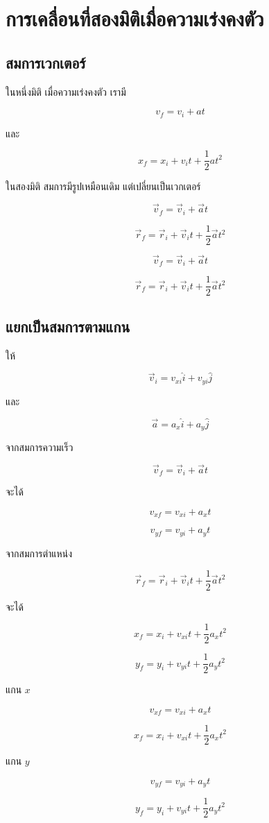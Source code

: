 \section{การเคลื่อนที่สองมิติเมื่อความเร่งคงตัว}

\subsection{สมการเวกเตอร์}

ในหนึ่งมิติ เมื่อความเร่งคงตัว เรามี

\[
v_f=v_i+at
\]

และ

\[
x_f=x_i+v_it+\frac{1}{2}at^2
\]

ในสองมิติ สมการมีรูปเหมือนเดิม แต่เปลี่ยนเป็นเวกเตอร์

\[
\vec{v}_f=\vec{v}_i+\vec{a}t
\]

\[
\vec{r}_f=\vec{r}_i+\vec{v}_it+\frac{1}{2}\vec{a}t^2
\]

\begin{tcolorbox}[title=สมการเวกเตอร์เมื่อความเร่งคงตัว]
\[
\vec{v}_f=\vec{v}_i+\vec{a}t
\]

\[
\vec{r}_f=\vec{r}_i+\vec{v}_it+\frac{1}{2}\vec{a}t^2
\]
\end{tcolorbox}

\subsection{แยกเป็นสมการตามแกน}

ให้

\[
\vec{v}_i=v_{xi}\hat{i}+v_{yi}\hat{j}
\]

และ

\[
\vec{a}=a_x\hat{i}+a_y\hat{j}
\]

จากสมการความเร็ว

\[
\vec{v}_f=\vec{v}_i+\vec{a}t
\]

จะได้

\[
v_{xf}=v_{xi}+a_xt
\]

\[
v_{yf}=v_{yi}+a_yt
\]

จากสมการตำแหน่ง

\[
\vec{r}_f=\vec{r}_i+\vec{v}_it+\frac{1}{2}\vec{a}t^2
\]

จะได้

\[
x_f=x_i+v_{xi}t+\frac{1}{2}a_xt^2
\]

\[
y_f=y_i+v_{yi}t+\frac{1}{2}a_yt^2
\]

\begin{tcolorbox}[title=สมการตามแกนเมื่อความเร่งคงตัว]
แกน $x$

\[
v_{xf}=v_{xi}+a_xt
\]

\[
x_f=x_i+v_{xi}t+\frac{1}{2}a_xt^2
\]

แกน $y$

\[
v_{yf}=v_{yi}+a_yt
\]

\[
y_f=y_i+v_{yi}t+\frac{1}{2}a_yt^2
\]
\end{tcolorbox}

